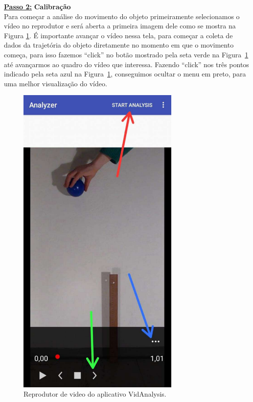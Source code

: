 \vskip 0.5cm
\underline{\bf Passo 2:} {\bf Calibração}\\


Para começar a análise do movimento do objeto primeiramente  
selecionamos o vídeo no reprodutor e será aberta a primeira imagem dele como se mostra na Figura \ref{apendice2c}. É importante avançar o vídeo nessa tela, para começar a coleta de dados da trajetória do objeto diretamente no momento em que o movimento  começa, para isso fazemos ``click'' no botão mostrado pela seta verde na Figura~\ref{apendice2c} até avançarmos ao quadro do vídeo que interessa. Fazendo ``click'' nos três pontos indicado pela seta azul na Figura~\ref{apendice2c}, conseguimos ocultar o menu em preto, para uma melhor visualização do vídeo.

\begin{figure}[h!]
\centering
\includegraphics[width=8cm]{Figuras_exp3/imagenapendicec2.pdf}
\caption{\label{apendice2c} Reprodutor de video do aplicativo VidAnalysis.}
\end{figure}

